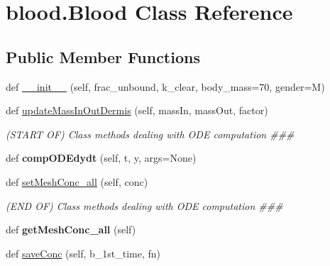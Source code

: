 \hypertarget{classblood_1_1Blood}{}\section{blood.\+Blood Class Reference}
\label{classblood_1_1Blood}
\subsection*{Public Member Functions}
\begin{DoxyCompactItemize}
\item 
def \hyperlink{classblood_1_1Blood_ace3e6d188e7983ec085d19f6920356cb}{\+\_\+\+\_\+init\+\_\+\+\_\+} (self, frac\+\_\+unbound, k\+\_\+clear, body\+\_\+mass=70, gender=\textquotesingle{}M\textquotesingle{})
\item 
def \hyperlink{classblood_1_1Blood_ac205ec72682730e1ddb3db838b43ecbd}{update\+Mass\+In\+Out\+Dermis} (self, mass\+In, mass\+Out, factor)
\begin{DoxyCompactList}\small\item\em (S\+T\+A\+RT OF) Class methods dealing with O\+DE computation \#\#\# \end{DoxyCompactList}\item 
def {\bfseries comp\+O\+D\+Edydt} (self, t, y, args=None)\hypertarget{classblood_1_1Blood_a39dfef20f3ac35b314d0c878e441f7a3}{}\label{classblood_1_1Blood_a39dfef20f3ac35b314d0c878e441f7a3}

\item 
def \hyperlink{classblood_1_1Blood_ad45ed3384aba6fb7e0e37648abaaf848}{set\+Mesh\+Conc\+\_\+all} (self, conc)\hypertarget{classblood_1_1Blood_ad45ed3384aba6fb7e0e37648abaaf848}{}\label{classblood_1_1Blood_ad45ed3384aba6fb7e0e37648abaaf848}

\begin{DoxyCompactList}\small\item\em (E\+ND OF) Class methods dealing with O\+DE computation \#\#\# \end{DoxyCompactList}\item 
def {\bfseries get\+Mesh\+Conc\+\_\+all} (self)\hypertarget{classblood_1_1Blood_a7b0fe3d5f68820b0371e76254a681443}{}\label{classblood_1_1Blood_a7b0fe3d5f68820b0371e76254a681443}

\item 
def \hyperlink{classblood_1_1Blood_a8814bc863db2657dbdd487f7feab6fab}{save\+Conc} (self, b\+\_\+1st\+\_\+time, fn)
\end{DoxyCompactItemize}
